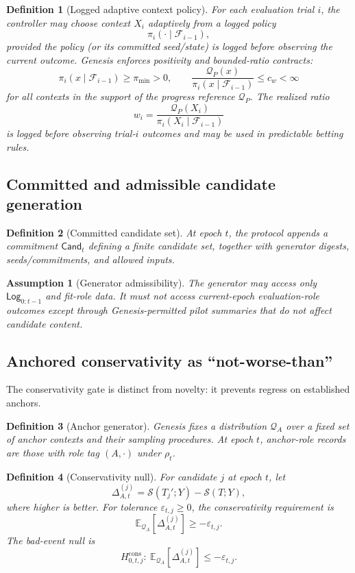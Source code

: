 \documentclass[11pt,a4paper]{article}
\newtheorem{definition}{Definition}[section]
\newtheorem{assumption}{Assumption}[section]
\newcommand{\Log}{\mathsf{Log}}
\newcommand{\Cand}{\mathsf{Cand}}
\begin{document}
\begin{definition}[Logged adaptive context policy]
For each evaluation trial $i$, the controller may choose context $X_i$ adaptively from a logged policy
\[
\pi_i(\cdot\mid\mathcal{F}_{i-1}),
\]
provided the policy (or its committed seed/state) is logged \emph{before} observing the current outcome.
Genesis enforces positivity and bounded-ratio contracts:
\[
\pi_i(x\mid\mathcal{F}_{i-1})\ge \pi_{\min}>0,\qquad
\frac{\mathcal{Q}_P(x)}{\pi_i(x\mid\mathcal{F}_{i-1})}\le c_w<\infty
\]
for all contexts in the support of the progress reference $\mathcal{Q}_P$.
The realized ratio
\[
w_i=\frac{\mathcal{Q}_P(X_i)}{\pi_i(X_i\mid\mathcal{F}_{i-1})}
\]
is logged before observing trial-$i$ outcomes and may be used in predictable betting rules.
\end{definition}

\subsection{Committed and admissible candidate generation}
\begin{definition}[Committed candidate set]
At epoch $t$, the protocol appends a commitment $\Cand_t$ defining a finite candidate set, together with generator digests, seeds/commitments, and allowed inputs.
\end{definition}

\begin{assumption}[Generator admissibility]
The generator may access only $\Log_{0:t-1}$ and fit-role data.
It must not access current-epoch evaluation-role outcomes except through Genesis-permitted pilot summaries that do not affect candidate content.
\end{assumption}

\subsection{Anchored conservativity as ``not-worse-than''}
The conservativity gate is distinct from novelty: it prevents regress on established anchors.

\begin{definition}[Anchor generator]
Genesis fixes a distribution $\mathcal{Q}_A$ over a fixed set of anchor contexts and their sampling procedures.
At epoch $t$, anchor-role records are those with role tag $(A,\cdot)$ under $\rho_t$.
\end{definition}

\begin{definition}[Conservativity null]
For candidate $j$ at epoch $t$, let
\[
\Delta_{A,t}^{(j)}=\mathcal{S}(T_j';Y)-\mathcal{S}(T;Y),
\]
where higher is better.
For tolerance $\varepsilon_{t,j}\ge 0$, the conservativity requirement is
\[
\mathbb{E}_{\mathcal{Q}_A}[\Delta_{A,t}^{(j)}]\ge -\varepsilon_{t,j}.
\]
The bad-event null is
\[
H^{\mathrm{cons}}_{0,t,j}:\ \mathbb{E}_{\mathcal{Q}_A}[\Delta_{A,t}^{(j)}]\le -\varepsilon_{t,j}.
\]
\end{definition}
\end{document}
